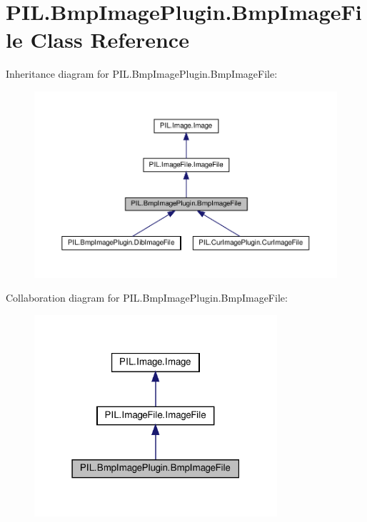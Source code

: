 \hypertarget{classPIL_1_1BmpImagePlugin_1_1BmpImageFile}{}\section{P\+I\+L.\+Bmp\+Image\+Plugin.\+Bmp\+Image\+File Class Reference}
\label{classPIL_1_1BmpImagePlugin_1_1BmpImageFile}


Inheritance diagram for P\+I\+L.\+Bmp\+Image\+Plugin.\+Bmp\+Image\+File\+:
\nopagebreak
\begin{figure}[H]
\begin{center}
\leavevmode
\includegraphics[width=350pt]{classPIL_1_1BmpImagePlugin_1_1BmpImageFile__inherit__graph}
\end{center}
\end{figure}


Collaboration diagram for P\+I\+L.\+Bmp\+Image\+Plugin.\+Bmp\+Image\+File\+:
\nopagebreak
\begin{figure}[H]
\begin{center}
\leavevmode
\includegraphics[width=255pt]{classPIL_1_1BmpImagePlugin_1_1BmpImageFile__coll__graph}
\end{center}
\end{figure}
